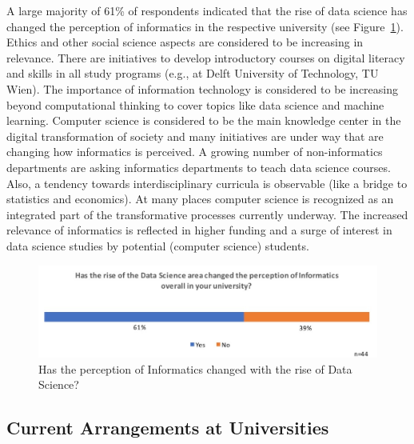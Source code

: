 A large majority of 61\% of respondents indicated that the rise of data science has changed the perception of informatics in the respective university (see Figure~\ref{sect4:}). Ethics and other social science aspects are considered to be increasing in relevance. There are initiatives to develop introductory courses on digital literacy and skills in all study programs (e.g., at Delft University of Technology, TU Wien). The importance of information technology is considered to be increasing beyond computational thinking to cover topics like data science and machine learning. Computer science is considered to be the main knowledge center in the digital transformation of society and many initiatives are under way that are changing how informatics is perceived. A growing number of non-informatics departments are asking informatics departments to teach data science courses. Also, a tendency towards interdisciplinary curricula is observable (like a bridge to statistics and economics). At many places computer science is recognized as an integrated part of the transformative processes currently underway. The increased relevance of informatics is reflected in higher funding and a surge of interest in data science studies by potential (computer science) students.

\begin{figure}[h]
\centering
\includegraphics[width = \linewidth]{charts/4b.jpg}
\caption{Has the perception of Informatics changed with the rise of Data Science?}
\label{sect4:}
\end{figure}

\subsection{Current Arrangements at Universities}

